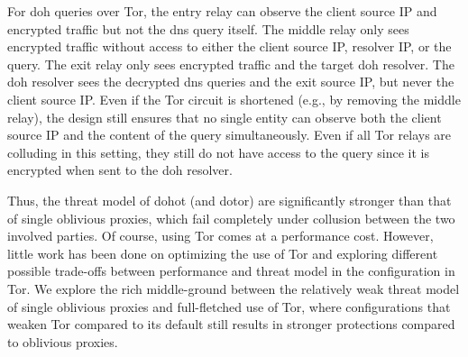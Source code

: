 For \ac{doh} queries over Tor, the entry relay can observe the client source IP
and encrypted traffic but not the \ac{dns} query itself. The middle relay only
sees encrypted traffic without access to either the client source IP, resolver
IP, or the query. The exit relay only sees encrypted traffic and the target
\ac{doh} resolver. The \ac{doh} resolver sees the decrypted \ac{dns} queries and
the exit source IP, but never the client source IP. Even if the Tor circuit is
shortened (e.g., by removing the middle relay), the design still ensures that no
single entity can observe both the client source IP and the content of the query
simultaneously. Even if all Tor relays are colluding in this setting, they still
do not have access to the query since it is encrypted when sent to the \ac{doh}
resolver.

Thus, the threat model of \ac{dohot} (and \ac{dotor}) are significantly stronger
than that of single oblivious proxies, which fail completely under collusion
between the two involved parties. Of course, using Tor comes at a performance
cost. However, little work has been done on optimizing the use of Tor and
exploring different possible trade-offs between performance and threat model in
the configuration in Tor. We explore the rich middle-ground between the
relatively weak threat model of single oblivious proxies and full-fletched use
of Tor, where configurations that weaken Tor compared to its default still
results in stronger protections compared to oblivious proxies.
